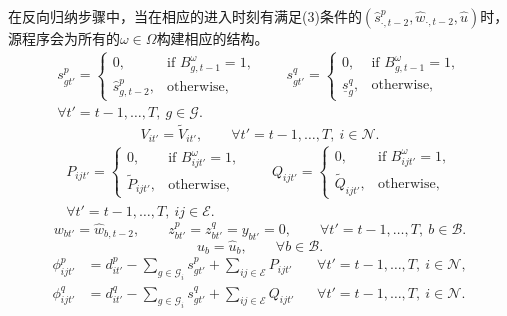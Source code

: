 \documentclass[10pt]{article}
\begin{document}
在反向归纳步骤中，当在相应的进入时刻有满足(3)条件的$(\hat s_{\cdot,t-2}^p,\hat w_{\cdot,t-2},\hat u)$时，源程序会为所有的$\omega\in\Omega$构建相应的结构。
\begin{equation}
\begin{gathered}
s_{gt'}^p=\begin{cases}0,&\text{if }B_{g,t-1}^\omega=1,\\\hat s_{g,t-2}^p,&\text{otherwise},\end{cases}
\qquad s_{gt'}^q=\begin{cases}0,&\text{if }B_{g,t-1}^\omega=1,\\\underline s_g^q,&\text{otherwise},\end{cases}\\
\forall t'=t-1,\ldots,T,\ g\in\mathcal G.
\end{gathered}\tag{5a}
\end{equation}
\begin{equation}
V_{it'}=\widetilde V_{it'},\qquad\forall t'=t-1,\ldots,T,\ i\in\mathcal N.\tag{5b}
\end{equation}
\begin{equation}
\begin{gathered}
P_{ijt'}=\begin{cases}0,&\text{if }B_{ijt'}^\omega=1,\\\widetilde P_{ijt'},&\text{otherwise},\end{cases}
\qquad Q_{ijt'}=\begin{cases}0,&\text{if }B_{ijt'}^\omega=1,\\\widetilde Q_{ijt'},&\text{otherwise},\end{cases}\\
\forall t'=t-1,\ldots,T,\ ij\in\mathcal E.
\end{gathered}\tag{5c}
\end{equation}
\begin{equation}
w_{bt'}=\hat w_{b,t-2},\qquad z_{bt'}^p=z_{bt'}^q=y_{bt'}=0,\qquad\forall t'=t-1,\ldots,T,\ b\in\mathcal B.\tag{5d}
\end{equation}
\begin{equation}
u_b=\hat u_b,\qquad\forall b\in\mathcal B.\tag{5e}
\end{equation}
\begin{align}
\phi_{ijt'}^p&=d_{it'}^p-\sum_{g\in\mathcal G_i}s_{gt'}^p+\sum_{ij\in\mathcal E}P_{ijt'}
&&\forall t'=t-1,\ldots,T,\ i\in\mathcal N,\tag{5f}\\
\phi_{ijt'}^q&=d_{it'}^q-\sum_{g\in\mathcal G_i}s_{gt'}^q+\sum_{ij\in\mathcal E}Q_{ijt'}
&&\forall t'=t-1,\ldots,T,\ i\in\mathcal N.\tag{5g}
\end{align}
\end{document}
